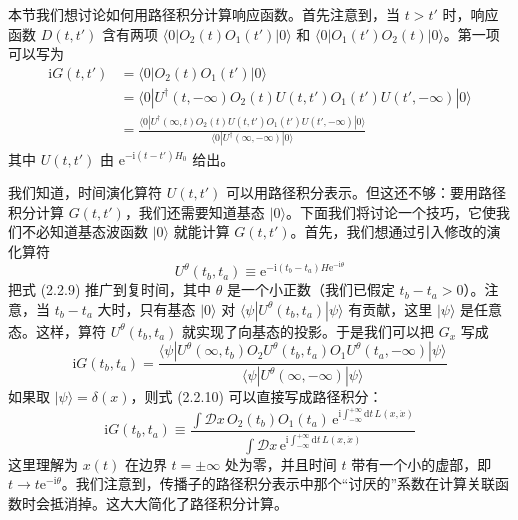 本节我们想讨论如何用路径积分计算响应函数。首先注意到，当 $t>t'$ 时，响应函数 $D(t,t')$ 含有两项 $\langle 0|O_2(t)O_1(t')|0\rangle$ 和 $\langle 0|O_1(t')O_2(t)|0\rangle$。第一项可以写为
\begin{align*}
\mathrm{i}G(t,t')&=\langle 0|O_2(t)O_1(t')|0\rangle\nonumber\\
&=\langle 0|U^\dagger(t,-\infty)O_2(t)U(t,t')O_1(t')U(t',-\infty)|0\rangle\nonumber\\
&=\frac{\langle 0|U^\dagger(\infty,t)O_2(t)U(t,t')O_1(t')U(t',-\infty)|0\rangle}{\langle 0|U^\dagger(\infty,-\infty)|0\rangle}\tag{2.2.9}
\end{align*}
其中 $U(t,t')$ 由 $\mathrm{e}^{-\mathrm{i}(t-t')H_0}$ 给出。

我们知道，时间演化算符 $U(t,t')$ 可以用路径积分表示。但这还不够：要用路径积分计算 $G(t,t')$，我们还需要知道基态 $|0\rangle$。下面我们将讨论一个技巧，它使我们不必知道基态波函数 $|0\rangle$ 就能计算 $G(t,t')$。首先，我们想通过引入修改的演化算符
\begin{equation*}
U^\theta(t_b,t_a)\equiv\mathrm{e}^{-\mathrm{i}(t_b-t_a)H\mathrm{e}^{-\mathrm{i}\theta}}
\end{equation*}
把式 (2.2.9) 推广到复时间，其中 $\theta$ 是一个小正数（我们已假定 $t_b-t_a>0$）。注意，当 $t_b-t_a$ 大时，只有基态 $|0\rangle$ 对 $\langle\psi|U^\theta(t_b,t_a)|\psi\rangle$ 有贡献，这里 $|\psi\rangle$ 是任意态。这样，算符 $U^\theta(t_b,t_a)$ 就实现了向基态的投影。于是我们可以把 $G_x$ 写成
\begin{equation*}
\mathrm{i}G(t_b,t_a)=\frac{\langle\psi|U^\theta(\infty,t_b)O_2U^\theta(t_b,t_a)O_1U^\theta(t_a,-\infty)|\psi\rangle}{\langle\psi|U^\theta(\infty,-\infty)|\psi\rangle}\tag{2.2.10}
\end{equation*}
如果取 $|\psi\rangle=\delta(x)$，则式 (2.2.10) 可以直接写成路径积分：
\begin{equation*}
\mathrm{i}G(t_b,t_a)\equiv\frac{\int\mathcal{D}x\,O_2(t_b)O_1(t_a)\,\mathrm{e}^{\mathrm{i}\int_{-\infty}^{+\infty}\mathrm{d}t\,L(x,\dot{x})}}{\int\mathcal{D}x\,\mathrm{e}^{\mathrm{i}\int_{-\infty}^{+\infty}\mathrm{d}t\,L(x,\dot{x})}}\tag{2.2.11}
\end{equation*}
这里理解为 $x(t)$ 在边界 $t=\pm\infty$ 处为零，并且时间 $t$ 带有一个小的虚部，即 $t\to t\mathrm{e}^{-\mathrm{i}\theta}$。我们注意到，传播子的路径积分表示中那个“讨厌的”系数在计算关联函数时会抵消掉。这大大简化了路径积分计算。

